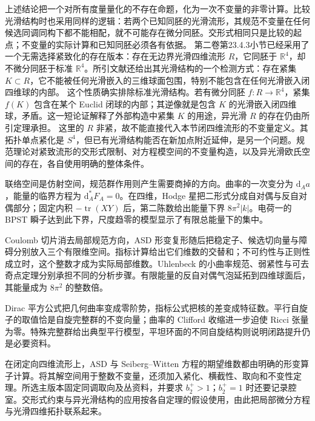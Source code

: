 上述结论把一个对所有度量量化的不存在命题，化为一次不变量的非零计算。比较光滑结构时也采用同样的逻辑：若两个已知同胚的光滑流形，其规范不变量在任何候选同调同构下都不能相配，就不可能存在微分同胚。交形式相同只是比较的起点；不变量的实际计算和已知同胚必须各有依据。
\ProseParagraphBreak
第二卷第23.4.3小节已经采用了一个无需选择紧致化的存在版本：存在无边界光滑四维流形 \(R\)，它同胚于 \(\mathbb R^4\)，却不微分同胚于标准 \(\mathbb R^4\)。所引文献还给出\cite[第XIV章定理1及其后注1，第95--96页]{Kirby1989TopologyFour}其光滑结构的一个检测方式：存在紧集 \(K\subset R\)，它不能被任何光滑嵌入的三维球面包围，特别不能包含在任何光滑嵌入闭四维球的内部。
\ProseParagraphBreak
这个性质确实排除标准光滑结构。若有微分同胚 \(f:R\to\mathbb R^4\)，紧集 \(f(K)\) 包含在某个 Euclid 闭球的内部；其逆像就是包含 \(K\) 的光滑嵌入闭四维球，矛盾。这一短论证解释了外部构造中紧集 \(K\) 的用途，异光滑 \(R\) 的存在仍由所引定理承担。
\ProseParagraphBreak
这里的 \(R\) 非紧，故不能直接代入本节闭四维流形的不变量定义。其拓扑单点紧化是 \(S^4\)，但已有光滑结构能否在新加点附近延伸，是另一个问题。规范理论对紧致流形的交形式限制、对方程模空间的不变量构造，以及异光滑欧氏空间的存在，各自使用明确的整体条件。

\begin{chaptersummary}
 联络空间是仿射空间，规范群作用则产生需要商掉的方向。曲率的一次变分为 \(\mathrm d_Aa\)，能量的临界方程为 \(\mathrm d_A^*F_A=0\)。在四维，Hodge 星把二形式分成自对偶与反自对偶部分；固定内积 \(-\operatorname{tr}(XY)\) 后，第二陈数给出能量下界 \(8\pi^2|k|\)。电荷一的 BPST 瞬子达到此下界，尺度趋零的模型显示了有限总能量下的集中。

 \ProseParagraphBreak
 Coulomb 切片消去局部规范方向，ASD 形变复形随后把稳定子、候选切向量与障碍分别放入三个有限维空间。指标计算给出它们维数的交替和；不可约性与正则性成立时，这个整数才成为实际局部维数。Uhlenbeck 的小曲率规范、弱紧性与可去奇点定理分别承担不同的分析步骤。有限能量的反自对偶气泡延拓到四维球面后，其能量成为 \(8\pi^2\) 的整数倍。

 \ProseParagraphBreak
 Dirac 平方公式把几何曲率变成零阶势，指标公式把核的差变成特征数。平行自旋子的取值恰是自旋完整群的不变向量；曲率的 Clifford 收缩进一步迫使 Ricci 张量为零。特殊完整群给出典型平行模型，平坦环面的不同自旋结构则说明闭路提升仍是必要资料。

 \ProseParagraphBreak
 在闭定向四维流形上，ASD 与 Seiberg--Witten 方程的期望维数都由明确的形变算子计算。将其解空间用于整数不变量，还须加入紧化、横截性、取向和不变性定理。所选主版本固定同调取向及丛资料，并要求 \(b_2^+>1\)；\(b_2^+=1\) 时还要记录腔室。交形式约束与异光滑结构的应用按各自定理的假设使用，由此把局部微分方程与光滑四维拓扑联系起来。
\end{chaptersummary}

